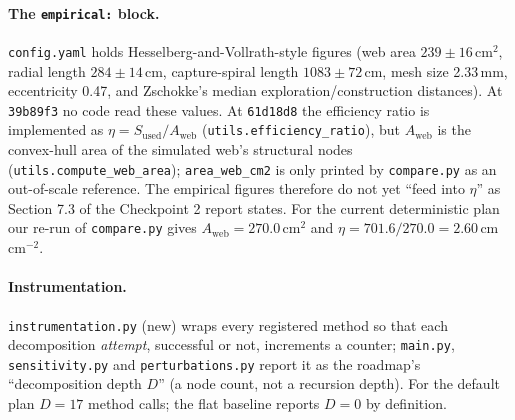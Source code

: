 \paragraph{The \texttt{empirical:} block.} \texttt{config.yaml} holds Hesselberg-and-Vollrath-style
figures (web area $239\pm16$\,cm$^2$, radial length $284\pm14$\,cm, capture-spiral length
$1083\pm72$\,cm, mesh size 2.33\,mm, eccentricity 0.47, and Zschokke's median exploration/construction
distances). At \texttt{39b89f3} no code read these values. At \texttt{61d18d8} the efficiency ratio is
implemented as $\eta = S_{\mathrm{used}}/A_{\mathrm{web}}$ (\texttt{utils.efficiency\_ratio}), but
$A_{\mathrm{web}}$ is the convex-hull area of the simulated web's structural nodes
(\texttt{utils.compute\_web\_area}); \texttt{area\_web\_cm2} is only printed by \texttt{compare.py} as an
out-of-scale reference. The empirical figures therefore do not yet ``feed into $\eta$'' as Section 7.3 of
the Checkpoint 2 report states. For the current deterministic plan our re-run of \texttt{compare.py} gives
$A_{\mathrm{web}}=270.0$\,cm$^2$ and $\eta = 701.6/270.0 = 2.60$\,cm\,cm$^{-2}$.

\paragraph{Instrumentation.} \texttt{instrumentation.py} (new) wraps every registered method so that each
decomposition \emph{attempt}, successful or not, increments a counter; \texttt{main.py},
\texttt{sensitivity.py} and \texttt{perturbations.py} report it as the roadmap's ``decomposition depth
$D$'' (a node count, not a recursion depth). For the default plan $D=17$ method calls; the flat baseline
reports $D=0$ by definition.

